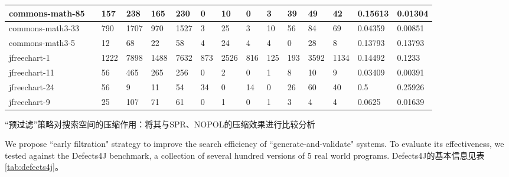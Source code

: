 \begin{landscape}
\begin{table}[]
\begin{tabular}{|l|l|l|l|l|l|l|l|l|l|l|l|l|l|l|}
		commons-math-85             &                     & 157   & 238    & 165    & 230    & 0     & 10    & 0   & 3   & 39                      & 49           & 42          & 0.15613         & 0.01304        \\ \hline
		commons-math3-33            &                     & 790   & 1707   & 970    & 1527   & 3     & 25    & 3   & 10  & 56                      & 84           & 69          & 0.04359         & 0.00851        \\ \hline
		commons-math3-5             &                     & 12    & 68     & 22     & 58     & 4     & 24    & 4   & 4   & 0                       & 28           & 8           & 0.13793         & 0.13793        \\ \hline
		jfreechart-1                &                     & 1222  & 7898   & 1488   & 7632   & 873   & 2526  & 816 & 125 & 193                     & 3592         & 1134        & 0.14492         & 0.1233         \\ \hline
		jfreechart-11               &                     & 56    & 465    & 265    & 256    & 0     & 2     & 0   & 1   & 8                       & 10           & 9           & 0.03409         & 0.00391        \\ \hline
		jfreechart-24               &                     & 56    & 9      & 11     & 54     & 34    & 0     & 14  & 0   & 26                      & 60           & 40          & 0.5             & 0.25926        \\ \hline
		jfreechart-9                &                     & 25    & 107    & 71     & 61     & 0     & 1     & 0   & 1   & 3                       & 4            & 4           & 0.0625          & 0.01639        \\ \hline
	\end{tabular}
\end{table}
\end{landscape}

“预过滤”策略对搜索空间的压缩作用：将其与SPR、NOPOL的压缩效果进行比较分析

We propose ``early filtration" strategy to improve the search efficiency of ``generate-and-validate" systems. To evaluate its effectiveness, we tested \SmartDebug against the Defects4J\cite{Just:2014:DDE:2610384.2628055}
benchmark, a collection of several hundred versions of 5 real world programs. Defects4J的基本信息见表\ref{tab:defects4j}。

